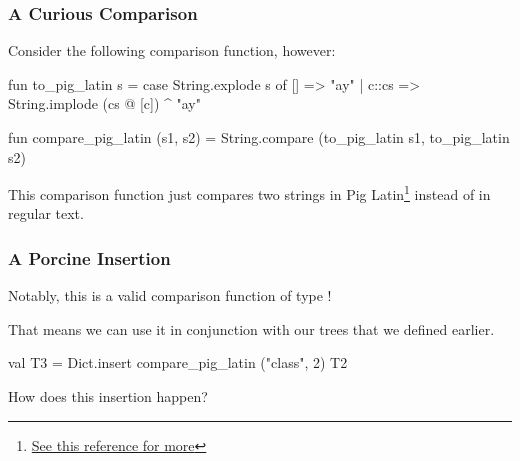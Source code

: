 \documentclass[aspectratio=169, handout]{beamer}
\begin{document}
\begin{frame}[fragile]
  \frametitle{A Curious Comparison}

  Consider the following comparison function, however:
  \pause

  \begin{codeblock}
    fun to_pig_latin s =
      case String.explode s of
        [] => "ay"
      | c::cs => String.implode (cs @ [c]) ^ "ay"

    fun compare_pig_latin (s1, s2) =
      String.compare (to_pig_latin s1, to_pig_latin s2)
  \end{codeblock}

  \pause
  \vspace{\fill}

  This comparison function just compares two strings in Pig Latin\footnote{
    {\color{blue}\href{https://en.wikipedia.org/wiki/Pig_Latin}{See this reference for more}}
  } instead of
  in regular text.
\end{frame}

\begin{frame}[fragile]
  \frametitle{A Porcine Insertion}

  Notably, this is a valid comparison function of type !

  \pause
  \vspace{\fill}

  That means we can use it in conjunction with our  trees
  that we defined earlier.

  \pause
  \vspace{\fill}

  \begin{codeblock}
    val T3 = Dict.insert compare_pig_latin ("class", 2) T2
  \end{codeblock}

  \pause
  \vspace{\fill}

  How does this insertion happen?
\end{frame}
\end{document}
